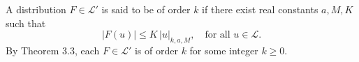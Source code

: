 A distribution $F \in \mathcal{L}'$ is said to be of order $k$ if there exist real constants $a, M, K$ such that
$$|F(u)| \leq K \, |u|_{k,a,M}, \quad \text{for all } u \in \mathcal{L}.$$
By Theorem 3.3, each $F \in \mathcal{L}'$ is of order $k$ for some integer $k \geq 0$.
